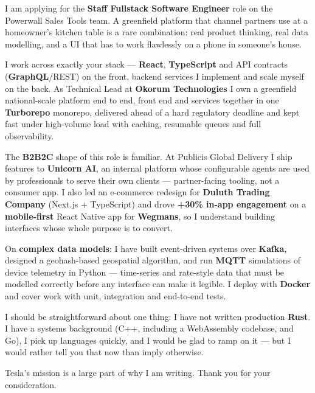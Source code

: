 \documentclass[11pt,a4paper]{awesome-cv}
\begin{document}
\makecvheader[R]
\makelettertitle

\begin{cvletter}

I am applying for the \textbf{Staff Fullstack Software Engineer} role on the Powerwall Sales Tools team. A greenfield platform that channel partners use at a homeowner's kitchen table is a rare combination: real product thinking, real data modelling, and a UI that has to work flawlessly on a phone in someone's house.

I work across exactly your stack --- \textbf{React}, \textbf{TypeScript} and API contracts (\textbf{GraphQL}/REST) on the front, backend services I implement and scale myself on the back. As Technical Lead at \textbf{Okorum Technologies} I own a greenfield national-scale platform end to end, front end and services together in one \textbf{Turborepo} monorepo, delivered ahead of a hard regulatory deadline and kept fast under high-volume load with caching, resumable queues and full observability.

The \textbf{B2B2C} shape of this role is familiar. At Publicis Global Delivery I ship features to \textbf{Unicorn AI}, an internal platform whose configurable agents are used by professionals to serve their own clients --- partner-facing tooling, not a consumer app. I also led an e-commerce redesign for \textbf{Duluth Trading Company} (Next.js + TypeScript) and drove \textbf{+30\% in-app engagement} on a \textbf{mobile-first} React Native app for \textbf{Wegmans}, so I understand building interfaces whose whole purpose is to convert.

On \textbf{complex data models}: I have built event-driven systems over \textbf{Kafka}, designed a geohash-based geospatial algorithm, and run \textbf{MQTT} simulations of device telemetry in Python --- time-series and rate-style data that must be modelled correctly before any interface can make it legible. I deploy with \textbf{Docker} and cover work with unit, integration and end-to-end tests.

I should be straightforward about one thing: I have not written production \textbf{Rust}. I have a systems background (C++, including a WebAssembly codebase, and Go), I pick up languages quickly, and I would be glad to ramp on it --- but I would rather tell you that now than imply otherwise.

Tesla's mission is a large part of why I am writing. Thank you for your consideration.



\end{cvletter}
\end{document}
